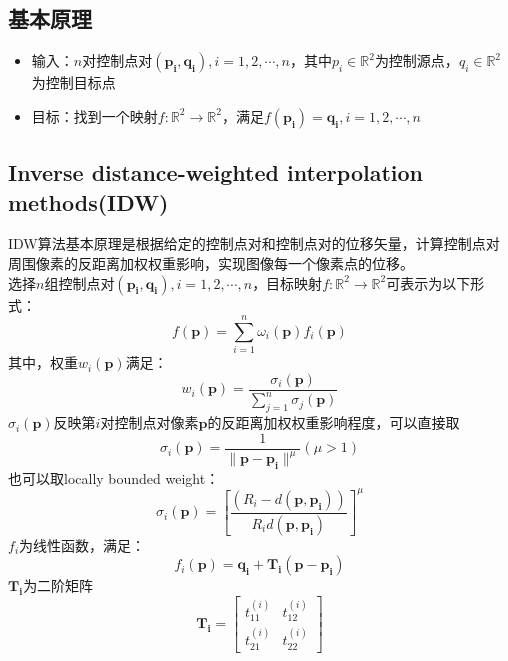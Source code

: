 \documentclass[14pt]{scrartcl} %
\begin{document}
\subsection{基本原理}
\begin{itemize}
	\item 输入：$n$对控制点对$(\boldsymbol{p_i},\boldsymbol{q_i}),i=1,2,\cdots,n$，其中$p_i\in \mathbb{R}^2$为控制源点，$q_i\in \mathbb{R}^2$为控制目标点
	\item 目标：找到一个映射$f:\mathbb{R}^2\rightarrow\mathbb{R}^2$，满足$f(\boldsymbol{p_i})=\boldsymbol{q_i},i=1,2,\cdots,n$
\end{itemize}

\subsection{Inverse distance-weighted interpolation methods(IDW)\cite{ruprecht1995image}}
IDW算法基本原理是根据给定的控制点对和控制点对的位移矢量，计算控制点对周围像素的反距离加权权重影响，实现图像每一个像素点的位移。\\
选择$n$组控制点对$(\boldsymbol{p_i},\boldsymbol{q_i}),i=1,2,\cdots,n$，目标映射$f:\mathbb{R}^2\rightarrow \mathbb{R}^2$可表示为以下形式：
\begin{equation}
f(\boldsymbol{p})=\sum^n_{i=1}\omega_i(\boldsymbol{p})f_i(\boldsymbol{p})
\end{equation}
其中，权重$w_i(\boldsymbol{p})$满足：
\begin{equation}
w_i(\boldsymbol{p})=\frac{\sigma_i(\boldsymbol{p})}{\sum\limits^n_{j=1} \sigma_j(\boldsymbol{p})}
\end{equation}
$\sigma_i(\boldsymbol{p})$反映第$i$对控制点对像素$\boldsymbol{p}$的反距离加权权重影响程度，可以直接取
\begin{equation}
\sigma_i(\boldsymbol{p})=\frac{1}{\|\boldsymbol{p}-\boldsymbol{p_i} \|^\mu} (\mu>1)
\end{equation}
也可以取locally bounded weight：
\begin{equation}
\sigma_i(\boldsymbol{p})=[\frac{(R_i-d(\boldsymbol{p},\boldsymbol{p_i}))}{R_id(\boldsymbol{p},\boldsymbol{p_i})}]^\mu
\end{equation}
$f_i$为线性函数，满足：
\begin{equation}
f_i(\boldsymbol{p})=\boldsymbol{q_i}+\boldsymbol{T_i}(\boldsymbol{p}-\boldsymbol{p_i})
\end{equation}
$\boldsymbol{T_i}$为二阶矩阵
\begin{equation}
\boldsymbol{T_i}=\begin{bmatrix}
t_{11}^{(i)}&t_{12}^{(i)}\\
t_{21}^{(i)}&t_{22}^{(i)}
\end{bmatrix}
\end{equation}
\end{document}
